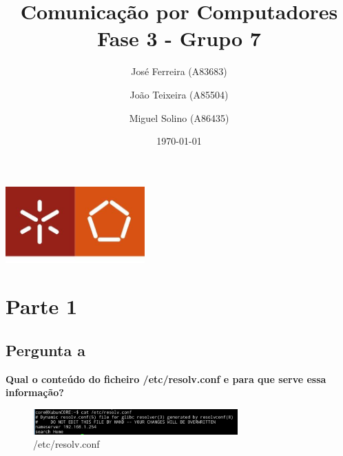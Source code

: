 \documentclass[a4paper]{report}
\begin{document}
\title{Comunicação por Computadores\\ 
\large Fase 3 - Grupo 7}
\author{José Ferreira (A83683) \and João Teixeira (A85504) \and Miguel Solino (A86435)}
\date{\today}

\begin{center}
    \begin{minipage}{0.75\linewidth}
        \centering
        \includegraphics[width=0.4\textwidth]{images/eng.jpeg}\par\vspace{1cm}
        \vspace{1.5cm}
        \href{https://www.uminho.pt/PT}
        {\color{black}{\scshape\LARGE Universidade do Minho}} \par
        \vspace{1cm}
        \href{https://www.di.uminho.pt/}
        {\color{black}{\scshape\Large Departamento de Informática}} \par
        \vspace{1.5cm}
        \maketitle
    \end{minipage}
\end{center}

\chapter{Parte 1}
\section{Pergunta a}
\textbf{Qual o conteúdo do ficheiro /etc/resolv.conf e para que serve essa
informação?}
\begin{figure}[H]
    \centering 
    \includegraphics[width=0.7\textwidth]{images/resolv.png}  
    \caption{/etc/resolv.conf}
    \label{fig:resolv}
\end{figure}
\end{document}
